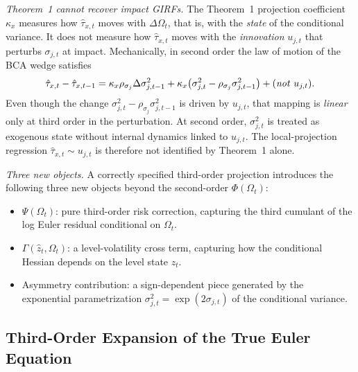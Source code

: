 \documentclass[11pt]{article}
\theoremstyle{plain}
\theoremstyle{definition}
\begin{document}
\noindent\textit{Theorem~1 cannot recover impact GIRFs.}
The Theorem~1 projection coefficient $\kappa_x$ measures
how $\hat\tau_{x,t}$ moves with $\Delta\Omega_t$, that is, with the
\emph{state} of the conditional variance. It does not measure how
$\hat\tau_{x,t}$ moves with the \emph{innovation} $u_{j,t}$ that perturbs
$\sigma_{j,t}$ at impact. Mechanically, in second order the law of motion of
the BCA wedge satisfies
\[
\hat\tau_{x,t} - \hat\tau_{x,t-1}
=
\kappa_x \rho_{\sigma_j} \Delta\sigma^2_{j,t-1}
+ \kappa_x \big(\sigma^2_{j,t}-\rho_{\sigma_j}\sigma^2_{j,t-1}\big)
+ \text{(\emph{not} } u_{j,t}\text{)}.
\]
Even though the change $\sigma^2_{j,t}-\rho_{\sigma_j}\sigma^2_{j,t-1}$ is
driven by $u_{j,t}$, that mapping is \emph{linear} only at third order in the
perturbation. At second order, $\sigma^2_{j,t}$ is treated as exogenous state
without internal dynamics linked to $u_{j,t}$. The local-projection regression
$\hat\tau_{x,t}\sim u_{j,t}$ is therefore not identified by Theorem~1 alone.

\medskip

\noindent\textit{Three new objects.} A correctly specified third-order
projection introduces the following three new objects beyond the second-order
$\Phi(\Omega_t)$:
\begin{itemize}
\item $\Psi(\Omega_t)$: pure third-order risk correction, capturing the third
cumulant of the log Euler residual conditional on $\Omega_t$.
\item $\Gamma(\hat z_t,\Omega_t)$: a level-volatility cross term, capturing
how the conditional Hessian depends on the level state $\hat z_t$.
\item Asymmetry contribution: a sign-dependent piece generated by the
exponential parametrization $\sigma^2_{j,t}=\exp(2\sigma_{j,t})$ of the
conditional variance.
\end{itemize}

\subsection{Third-Order Expansion of the True Euler Equation}
\end{document}
